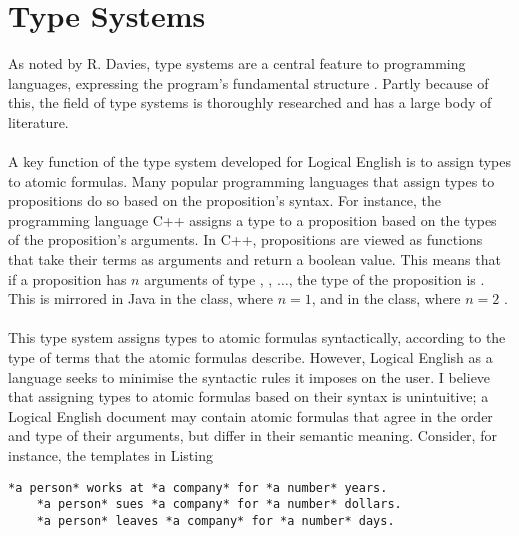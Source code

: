 \documentclass[../main.tex]{subfiles}
\begin{document}

\section{Type Systems}
\label{section:type-system-review}
As noted by R. Davies, type systems are a central feature to programming languages, expressing the program's fundamental structure \cite[p.~1]{refinement_types}. Partly because of this, the field of type systems is thoroughly researched and has a large body of literature. 
\\
\\
A key function of the type system developed for Logical English is to assign types to atomic formulas. Many popular programming languages that assign types to propositions do so based on the proposition's syntax. For instance, the programming language C++ assigns a type to a proposition based on the types of the proposition's arguments. In C++, propositions are viewed as functions that take their terms as arguments and return a boolean value. This means that if a proposition has $n$ arguments of type , , $\dots$,  the type of the proposition is  \cite{std_predicate}. This is mirrored in Java in the  class, where $n = 1$, and in the  class, where $n = 2$ \cite{java_util_function}. 
\\
\\
This type system assigns types to atomic formulas syntactically, according to the type of terms that the atomic formulas describe. However, Logical English as a language seeks to minimise the syntactic rules it imposes on the user. I believe that assigning types to atomic formulas based on their syntax is unintuitive; a Logical English document may contain atomic formulas that agree in the order and type of their arguments, but differ in their semantic meaning. Consider, for instance, the templates in Listing \cite{le:same-product-type}
\begin{lstlisting}[language=LE,caption={Logical English templates that have differing semantic meaning, but under a syntactic type system would be grouped under the same type.},label={le:same-product-type}]
    *a person* works at *a company* for *a number* years.
    *a person* sues *a company* for *a number* dollars.
    *a person* leaves *a company* for *a number* days.
\end{lstlisting}
\end{document}
